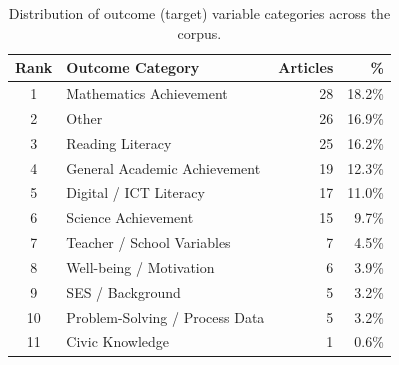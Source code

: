 \begin{table}[htbp]
  \centering
  \caption{Distribution of outcome (target) variable categories across the corpus.}
  \label{tab:outcomes}
  \begin{tabular}{clrr}
    \toprule
    Rank & Outcome Category & Articles & \% \\
    \midrule
    1 & Mathematics Achievement & 28 & 18.2\% \\
    2 & Other & 26 & 16.9\% \\
    3 & Reading Literacy & 25 & 16.2\% \\
    4 & General Academic Achievement & 19 & 12.3\% \\
    5 & Digital / ICT Literacy & 17 & 11.0\% \\
    6 & Science Achievement & 15 & 9.7\% \\
    7 & Teacher / School Variables & 7 & 4.5\% \\
    8 & Well-being / Motivation & 6 & 3.9\% \\
    9 & SES / Background & 5 & 3.2\% \\
    10 & Problem-Solving / Process Data & 5 & 3.2\% \\
    11 & Civic Knowledge & 1 & 0.6\% \\
    \bottomrule
  \end{tabular}
\end{table}